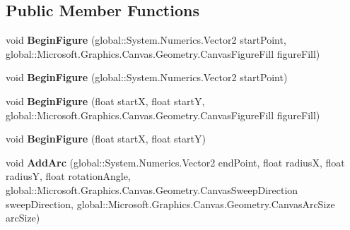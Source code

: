 \subsection*{Public Member Functions}
\begin{DoxyCompactItemize}
\item 
\mbox{\label{interface_microsoft_1_1_graphics_1_1_canvas_1_1_geometry_1_1_i_canvas_path_builder_afe2a6e4649d8c29aaa44335cebe61dc5}} 
void {\bfseries Begin\+Figure} (global\+::\+System.\+Numerics.\+Vector2 start\+Point, global\+::\+Microsoft.\+Graphics.\+Canvas.\+Geometry.\+Canvas\+Figure\+Fill figure\+Fill)
\item 
\mbox{\label{interface_microsoft_1_1_graphics_1_1_canvas_1_1_geometry_1_1_i_canvas_path_builder_aa01f534a0d57d542b6e74f2939e13d54}} 
void {\bfseries Begin\+Figure} (global\+::\+System.\+Numerics.\+Vector2 start\+Point)
\item 
\mbox{\label{interface_microsoft_1_1_graphics_1_1_canvas_1_1_geometry_1_1_i_canvas_path_builder_ab65fd089f5c2a5bdb2e36fe9c552044a}} 
void {\bfseries Begin\+Figure} (float startX, float startY, global\+::\+Microsoft.\+Graphics.\+Canvas.\+Geometry.\+Canvas\+Figure\+Fill figure\+Fill)
\item 
\mbox{\label{interface_microsoft_1_1_graphics_1_1_canvas_1_1_geometry_1_1_i_canvas_path_builder_acbe72d48edf4e1066adf59e9f7057323}} 
void {\bfseries Begin\+Figure} (float startX, float startY)
\item 
\mbox{\label{interface_microsoft_1_1_graphics_1_1_canvas_1_1_geometry_1_1_i_canvas_path_builder_aeb2d7c2ee7825de333cf7adbdc0901c8}} 
void {\bfseries Add\+Arc} (global\+::\+System.\+Numerics.\+Vector2 end\+Point, float radiusX, float radiusY, float rotation\+Angle, global\+::\+Microsoft.\+Graphics.\+Canvas.\+Geometry.\+Canvas\+Sweep\+Direction sweep\+Direction, global\+::\+Microsoft.\+Graphics.\+Canvas.\+Geometry.\+Canvas\+Arc\+Size arc\+Size)

\end{DoxyCompactItemize}
